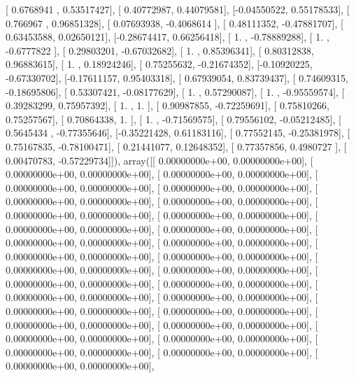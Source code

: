 \documentclass{article}
\begin{document}
       [ 0.6768941 ,  0.53517427],
       [ 0.40772987,  0.44079581],
       [-0.04550522,  0.55178533],
       [ 0.766967  ,  0.96851328],
       [ 0.07693938, -0.4068614 ],
       [ 0.48111352, -0.47881707],
       [ 0.63453588,  0.02650121],
       [-0.28674417,  0.66256418],
       [ 1.        , -0.78889288],
       [ 1.        , -0.6777822 ],
       [ 0.29803201, -0.67032682],
       [ 1.        ,  0.85396341],
       [ 0.80312838,  0.96883615],
       [ 1.        ,  0.18924246],
       [ 0.75255632, -0.21674352],
       [-0.10920225, -0.67330702],
       [-0.17611157,  0.95403318],
       [ 0.67939054,  0.83739437],
       [ 0.74609315, -0.18695806],
       [ 0.53307421, -0.08177629],
       [ 1.        ,  0.57290087],
       [ 1.        , -0.95559574],
       [ 0.39283299,  0.75957392],
       [ 1.        ,  1.        ],
       [ 0.90987855, -0.72259691],
       [ 0.75810266,  0.75257567],
       [ 0.70864338,  1.        ],
       [ 1.        , -0.71569575],
       [ 0.79556102, -0.05212485],
       [ 0.5645434 , -0.77355646],
       [-0.35221428,  0.61183116],
       [ 0.77552145, -0.25381978],
       [ 0.75167835, -0.78100471],
       [ 0.21441077,  0.12648352],
       [ 0.77357856,  0.4980727 ],
       [ 0.00470783, -0.57229734]]), array([[  0.00000000e+00,   0.00000000e+00],
       [  0.00000000e+00,   0.00000000e+00],
       [  0.00000000e+00,   0.00000000e+00],
       [  0.00000000e+00,   0.00000000e+00],
       [  0.00000000e+00,   0.00000000e+00],
       [  0.00000000e+00,   0.00000000e+00],
       [  0.00000000e+00,   0.00000000e+00],
       [  0.00000000e+00,   0.00000000e+00],
       [  0.00000000e+00,   0.00000000e+00],
       [  0.00000000e+00,   0.00000000e+00],
       [  0.00000000e+00,   0.00000000e+00],
       [  0.00000000e+00,   0.00000000e+00],
       [  0.00000000e+00,   0.00000000e+00],
       [  0.00000000e+00,   0.00000000e+00],
       [  0.00000000e+00,   0.00000000e+00],
       [  0.00000000e+00,   0.00000000e+00],
       [  0.00000000e+00,   0.00000000e+00],
       [  0.00000000e+00,   0.00000000e+00],
       [  0.00000000e+00,   0.00000000e+00],
       [  0.00000000e+00,   0.00000000e+00],
       [  0.00000000e+00,   0.00000000e+00],
       [  0.00000000e+00,   0.00000000e+00],
       [  0.00000000e+00,   0.00000000e+00],
       [  0.00000000e+00,   0.00000000e+00],
       [  0.00000000e+00,   0.00000000e+00],
       [  0.00000000e+00,   0.00000000e+00],
       [  0.00000000e+00,   0.00000000e+00],
       [  0.00000000e+00,   0.00000000e+00],
       [  0.00000000e+00,   0.00000000e+00],
       [  0.00000000e+00,   0.00000000e+00],
\end{document}
